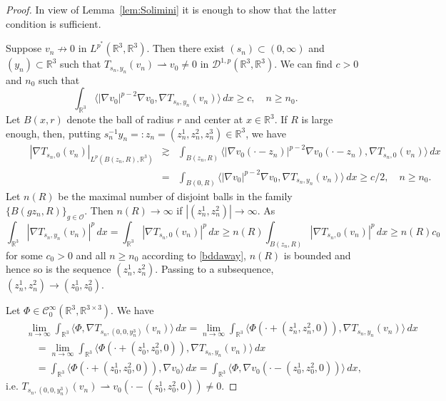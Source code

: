 \documentclass[12pt,leqno,twoside]{amsart}
\def\R{\mathbb{R}}
\newcommand{\cC}{{\mathcal C}}
\newcommand{\cD}{{\mathcal D}}
\newcommand{\cDp}{\cD^{1,p}(\R^3,\R^3)}
\newcommand{\cO}{{\mathcal O}}
\def\r{\mathbb{R}}
\def\r3{\mathbb{R}^3}
\def\ir3{\int_{\r3}}
\newcommand{\weakto}{\rightharpoonup}
\numberwithin{equation}{section}
\begin{document}
\begin{proof}	
In view of Lemma~\ref{lem:Solimini} it is enough to show that the latter condition is sufficient. 
	
Suppose $v_n\not\to 0$ in $L^{p^*}(\R^3,\R^3)$. Then there exist $(s_n)\subset (0,\infty)$ and $(y_n)\subset\R^3$ such that $T_{s_n,y_n}(v_n)\weakto v_0\ne 0$ in $\cDp$. 
We can find $c>0$ and $n_0$ such that  
\begin{equation*}
\ir3\langle |\nabla v_0|^{p-2}\nabla v_0, \nabla T_{s_n,y_n}(v_n)\rangle\,dx \ge c, \quad n\ge n_0.
\end{equation*}
Let $B(x,r)$ denote the ball of radius $r$ and center at $x\in\r3$. If $R$ is large enough, then, putting $s_n^{-1}y_n =: z_n = (z_n^1,z_n^2,z_n^3)\in \R^3$, we have
\begin{eqnarray} \label{bddaway}
\qquad|\nabla T_{s_n,0}(v_n)|_{L^p(B(z_n,R),\r3)} & \gtrsim & \int_{B(z_n,R)}\langle |\nabla v_0(\cdot-z_n)|^{p-2}\nabla v_0(\cdot-z_n), \nabla T_{s_n,0}(v_n)\rangle\,dx \\
& = & \int_{B(0,R)}\langle |\nabla v_0|^{p-2}\nabla v_0, \nabla T_{s_n,y_n}(v_n)\rangle\,dx \ge c/2, \quad n\ge n_0. \nonumber
\end{eqnarray}
Let $n(R)$ be the maximal number of disjoint balls in the family $\{B(gz_n,R)\}_{g\in\cO}$. Then $n(R)\to\infty$ if $|(z_n^1,z_n^2)|\to\infty$. As
\[
\ir3|\nabla T_{s_n,y_n}(v_n)|^p\,dx = \ir3|\nabla T_{s_n,0}(v_n)|^p\,dx 
\ge n(R)\int_{B(z_n,R)}|\nabla T_{s_n,0}(v_n)|^p\,dx \ge n(R)c_0 
\]
for some $c_0>0$ and all $n\ge n_0$ according to  \eqref{bddaway}, $n(R)$ is bounded and hence so is the sequence $(z_n^1,z_n^2)$. Passing to a subsequence, $(z_n^1,z_n^2)\to (z_0^1,z_0^2).$ 



 Let $\Phi\in \cC_0^\infty(\r3,\R^{3\times 3})$. We have
\begin{eqnarray*}
&&\lim_{n\to\infty}\ir3\langle\Phi,\nabla T_{s_n,(0,0,y_n^3)}(v_n)\rangle\,dx
= \lim_{n\to\infty}\ir3\langle \Phi(\cdot+(z_n^1,z_n^2,0)),\nabla T_{s_n,y_n}(v_n)\rangle\,dx \\
&& \quad= \lim_{n\to\infty}\ir3\langle \Phi(\cdot+(z_0^1,z_0^2,0)),\nabla T_{s_n,y_n}(v_n)\rangle\,dx \\
&& \quad=\ir3\langle \Phi(\cdot+(z_0^1,z_0^2,0)),\nabla v_0\rangle\,dx 
= \ir3\langle \Phi,\nabla v_0(\cdot-(z_0^1,z_0^2,0))\rangle\,dx,
\end{eqnarray*}
i.e. $T_{s_n,(0,0,y_n^3)}(v_n)\weakto  v_0(\cdot-(z_0^1,z_0^2,0))\neq 0$.
\end{proof}
\end{document}
